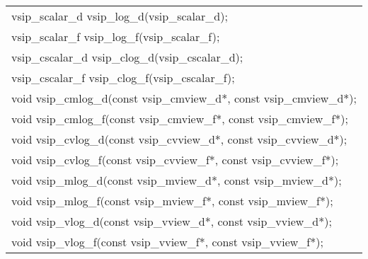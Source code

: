 \\\cvsiplh
\afh
\\\hspace*{.04\textwidth} {
\ttfamily
\begin{tabular}{l}
vsip\_scalar\_d vsip\_log\_d(vsip\_scalar\_d);\\
vsip\_scalar\_f vsip\_log\_f(vsip\_scalar\_f);\\
vsip\_cscalar\_d vsip\_clog\_d(vsip\_cscalar\_d);\\
vsip\_cscalar\_f vsip\_clog\_f(vsip\_cscalar\_f);\\
void vsip\_cmlog\_d(const vsip\_cmview\_d*, const vsip\_cmview\_d*);\\
void vsip\_cmlog\_f(const vsip\_cmview\_f*, const vsip\_cmview\_f*);\\
void vsip\_cvlog\_d(const vsip\_cvview\_d*, const vsip\_cvview\_d*);\\
void vsip\_cvlog\_f(const vsip\_cvview\_f*, const vsip\_cvview\_f*);\\
void vsip\_mlog\_d(const vsip\_mview\_d*, const vsip\_mview\_d*);\\
void vsip\_mlog\_f(const vsip\_mview\_f*, const vsip\_mview\_f*);\\
void vsip\_vlog\_d(const vsip\_vview\_d*, const vsip\_vview\_d*);\\
void vsip\_vlog\_f(const vsip\_vview\_f*, const vsip\_vview\_f*);\\
\end{tabular}
}
\\\pyjvsiph
{}
